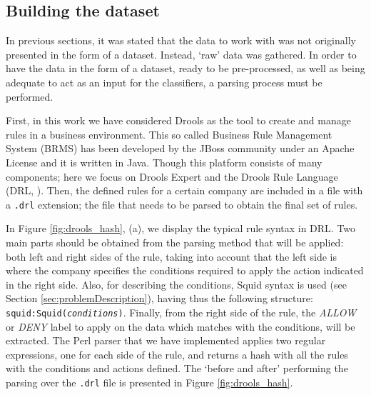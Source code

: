 \documentclass{llncs}
\begin{document}
%
\subsection{Building the dataset}
\label{sec:buldingdataset}

In previous sections, it was stated that the data to work with was not originally presented in the form of a dataset. Instead, `raw' data was gathered. In order to have the data in the form of a dataset, ready to be pre-processed, as well as being adequate to act as an input for the classifiers, a parsing process must be performed.

First, in this work we have considered Drools \cite{drools:site} as the tool to create and  manage rules in a business environment. This so called Business Rule Management System (BRMS) has been developed by the JBoss community under an Apache License and it is written in Java. Though this platform consists of many components; here we focus on Drools Expert and the Drools Rule Language (DRL, \cite{drools:doc}). Then, the defined rules for a certain company are included in a file with a \texttt{.drl} extension; the file that needs to be parsed to obtain the final set of rules. 

In Figure \ref{fig:drools_hash}, (a), we display the typical rule syntax in DRL. Two main parts should be obtained from the parsing method that will be applied: both left and right sides of the rule, taking into account that the left side is where the company specifies the conditions required to apply the action indicated in the right side. Also, for describing the conditions, Squid syntax is used (see Section \ref{sec:problemDescription}), having thus the following structure: \texttt{squid:Squid(\textit{conditions})}. Finally, from the right side of the rule, the \textit{ALLOW} or \textit{DENY} label to apply on the data which matches with the conditions, will be extracted. 
The Perl parser that we have implemented applies two regular expressions, one for each side of the rule, and returns a hash with all the rules with the conditions and actions defined. The `before and after' performing the parsing over the \texttt{.drl} file is presented in Figure \ref{fig:drools_hash}.
\end{document}
